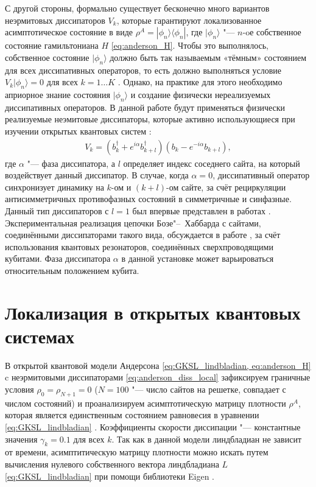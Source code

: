 С другой стороны, формально существует бесконечно много вариантов неэрмитовых диссипаторов \(V_k\), которые гарантируют локализованное асимптотическое состояние в виде \(\rho^A = | \phi_n \rangle \langle \phi_n |\), где \(| \phi_n \rangle\) "--- \(n\)-oе собственное состояние гамильтониана \(H\) \cref{eq:anderson_H}. 
Чтобы это выполнялось, собственное состояние \(| \phi_n \rangle\) должно быть так называемым «тёмным» состоянием для всех диссипативных операторов, то есть должно выполняться условие \(V_k | \phi_n \rangle = 0\) для всех \(k=1 \ldots K\) \cite{Diehl2008, Kraus2008}. 
Однако, на практике для этого необходимо априорное знание состояния \(| \phi_n \rangle\) и создание физически нереализуемых диссипативных операторов.
В данной работе будут применяться физически реализуемые неэмитовые диссипаторы, которые активно использующиеся при изучении открытых квантовых систем \cite{Diehl2008, Kraus2008, Bardyn2013, Barreiro2010, Kienzler2014, Vorberg2013}:
\begin{equation}
\label{eq:anderson_diss_local}
\begin{gathered}
V_k = \left( b^\dagger_k + e^{i \alpha} b^\dagger_{k+l}\right) \left( b_k - e^{-i \alpha} b_{k+l} \right),
\end{gathered}
\end{equation}
где \(\alpha\) "--- фаза диссипатора, а \(l\) определяет индекс соседнего сайта, на который воздействует данный диссипатор. 
В случае, когда \(\alpha = 0\), диссипативный оператор синхронизует динамику на \(k\)-ом и \((k+l)\)-ом сайте, за счёт рециркуляции антисимметричных противофазных состояний в симметричные и синфазные. 
Данный тип диссипаторов с \(l=1\) был впервые представлен в работах \cite{Diehl2008, Kraus2008}.
Экспериментальная реализация цепочки Бозе"--~Хаббарда с сайтами, соединёнными диссипаторами такого вида, обсуждается в работе \cite{Marcos2012}, за счёт использования квантовых резонаторов, соединённых сверхпроводящими кубитами.
Фаза диссипатора \(\alpha\) в данной установке может варьироваться относительным положением кубита.

\section{Локализация в открытых квантовых системах}\label{sec:ch1/sec4}

В открытой квантовой модели Андерсона \cref{eq:GKSL_lindbladian, eq:anderson_H} c неэрмитовыми диссипаторами \cref{eq:anderson_diss_local} зафиксируем граничные условия \(\rho_0 = \rho_{N+1} = 0\) (\(N = 100\) "--- число сайтов на решетке, совпадает с числом состояний) и проанализируем асимптотическую матрицу плотности \(\rho^A\), которая является единственным состоянием равновесия в уравнении \cref{eq:GKSL_lindbladian} \cite{book2007, Albert2014}. Коэффициенты скорости диссипации "--- константные значения \(\gamma_k = 0.1\) для всех \(k\).
Так как в данной модели линдбладиан не зависит от времени, асимптитическую матрицу плотности можно искать путем вычисления нулевого собственного вектора линдбладиана \(L\) \cref{eq:GKSL_lindbladian} при помощи библиотеки Eigen \cite{eigenweb}.

